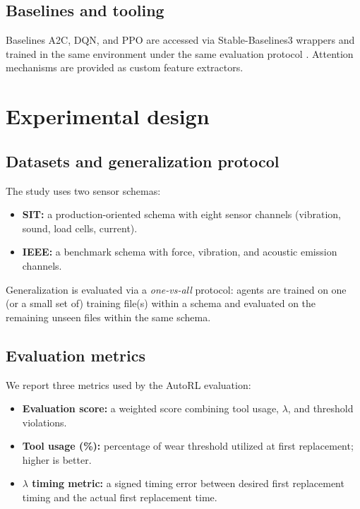 \documentclass[11pt]{article}
\begin{document}
\subsection{Baselines and tooling}
Baselines A2C, DQN, and PPO are accessed via Stable-Baselines3 wrappers and trained in the same environment under the same evaluation protocol \parencite{StableBaselines3}. Attention mechanisms are provided as custom feature extractors.

\section{Experimental design}
\label{sec:experiment}
\subsection{Datasets and generalization protocol}
The study uses two sensor schemas:
\begin{itemize}
	\item \textbf{SIT:} a production-oriented schema with eight sensor channels (vibration, sound, load cells, current).
	\item \textbf{IEEE:} a benchmark schema with force, vibration, and acoustic emission channels.
\end{itemize}

Generalization is evaluated via a \emph{one-vs-all} protocol: agents are trained on one (or a small set of) training file(s) within a schema and evaluated on the remaining unseen files within the same schema.

\subsection{Evaluation metrics}
\label{sec:metrics}
We report three metrics used by the AutoRL evaluation:
\begin{itemize}
	\item \textbf{Evaluation score:} a weighted score combining tool usage, $\lambda$, and threshold violations.
	\item \textbf{Tool usage (\%):} percentage of wear threshold utilized at first replacement; higher is better.
	\item \textbf{$\lambda$ timing metric:} a signed timing error between desired first replacement timing and the actual first replacement time.
\end{itemize}
\end{document}
